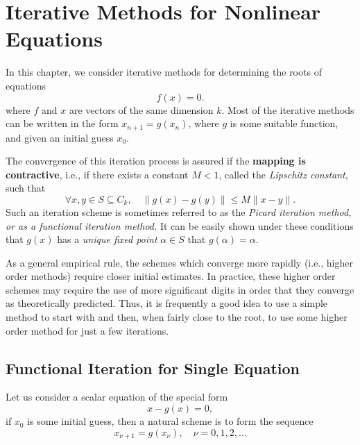 \documentclass[../main.tex]{subfiles}
\begin{document}
\chapter{Iterative Methods for Nonlinear Equations}
In this chapter, we consider iterative methods for determining the roots of equations
\begin{equation}
	f(x) = 0.
\end{equation}
where $f$ and $x$ are vectors of the same dimension $k$. Most of the iterative methods can be written in the form $x_{n+1} = g(x_n)$, where $g$ is some suitable function, and given an initial guess $x_0$.

The convergence of this iteration process is assured if the \textbf{mapping is contractive}, i.e., if there exists a constant $M < 1$, called the \emph{Lipschitz constant}, such that
\begin{equation}
	\forall x, y \in S \subseteq C_k, \quad \|g(x) - g(y)\| \leq M \|x - y\|.
\end{equation}
Such an iteration scheme is sometimes referred to as the \emph{Picard iteration method, or as a functional iteration method.} It can be easily shown under these conditions that $g(x)$ has a \emph{unique fixed point} $\alpha \in S$ that $g(\alpha) = \alpha$.

As a general empirical rule, the schemes which converge more rapidly (i.e., higher order methods) require closer initial estimates. In practice, these higher order schemes may require the use of more significant digits in order that they converge as theoretically predicted. Thus, it is frequently a good idea to use a simple method to start with and then, when fairly close to the root, to use some higher order method for just a few iterations.

\section{Functional Iteration for Single Equation}
Let us consider a scalar equation of the special form
\begin{equation}
	x - g(x) = 0,
\end{equation}
if $x_0$ is some initial guess, then a natural scheme is to form the sequence
\begin{equation}
	x_{\nu+1} = g(x_\nu), \quad \nu = 0, 1, 2, \ldots
\end{equation}
\end{document}
